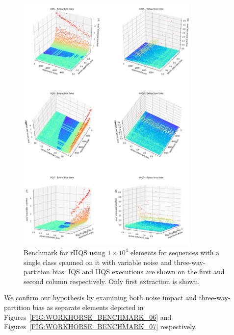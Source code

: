 \begin{figure}[!ht]
    \centering
    \includegraphics[width=0.8\textwidth]{./fragments/05_workhorse_experiment/images/01_basebenchmark_06_noise_redundant_bias.png}
    \caption{Benchmark for rIIQS using $1\times10^4$ elements for sequences with a single class spanned on it with variable noise and three-way-partition bias. IQS and IIQS executions are shown on the first and second column respectively. Only first extraction is shown.}
    \label{FIG:WORKHORSE_BENCHMARK_05}
\end{figure}

We confirm our hypothesis by examining both noise impact and three-way-partition bias as separate elements depicted in Figures~\ref{FIG:WORKHORSE_BENCHMARK_06} and Figures~\ref{FIG:WORKHORSE_BENCHMARK_07} respectively.

